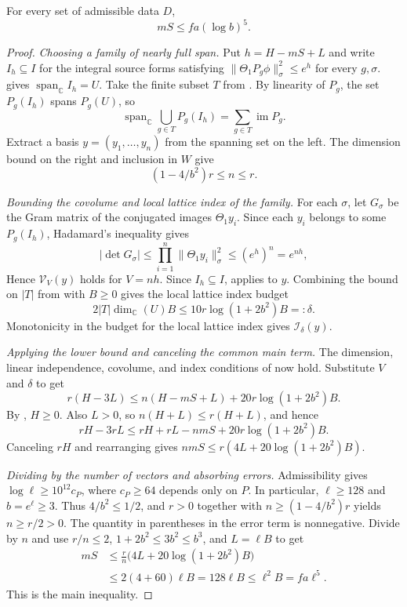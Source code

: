 \begin{theorem}
\label{thm:star}
\emitthmsource
For every set of admissible data $D$,
\begin{equation}
  mS\le fa(\log b)^5.
\tag{$\star$}\label{eq:ch1-star}
\end{equation}
\end{theorem}
\begin{proof}
\emph{Choosing a family of nearly full span.}
Put $h=H-mS+L$ and write $I_h\subseteq I$ for the integral source forms satisfying $\|\Theta_1P_g\phi\|_\sigma^2\le e^h$ for every $g,\sigma$.  gives $\operatorname{span}_{\mathbb C} I_h=U$. Take the finite subset $T$ from . By linearity of $P_g$, the set $P_g(I_h)$ spans $P_g(U)$, so
\[
 \operatorname{span}_{\mathbb C}\bigcup_{g\in T}P_g(I_h)
 =\sum_{g\in T}\operatorname{im}P_g.
\]
Extract a basis $y=(y_1,\ldots,y_n)$ from the spanning set on the left. The dimension bound on the right and inclusion in $W$ give
\[
 (1-4/b^2)r\le n\le r.
\]

\emph{Bounding the covolume and local lattice index of the family.}
For each $\sigma$, let $G_\sigma$ be the Gram matrix of the conjugated images $\Theta_1y_i$. Since each $y_i$ belongs to some $P_g(I_h)$, Hadamard's inequality gives
\[
 |\det G_\sigma|\le\prod_{i=1}^{n}\|\Theta_1y_i\|^2_\sigma
 \le(e^h)^n=e^{nh},
\]
Hence $\mathcal V_V(y)$ holds for $V=nh$. Since $I_h\subseteq I$,  applies to $y$. Combining the bound on $|T|$ from  with $B\ge0$ gives the local lattice index budget
\[
 2|T|\dim_{\mathbb C}(U)B\le 10r\log(1+2b^2)B=:\delta.
\]
Monotonicity in the budget for the local lattice index gives $\mathcal I_\delta(y)$.

\emph{Applying the lower bound and canceling the common main term.}
The dimension, linear independence, covolume, and index conditions of  now hold. Substitute $V$ and $\delta$ to get
\[
 r(H-3L)\le n(H-mS+L)+20r\log(1+2b^2)B.
\]
By , $H\ge0$. Also $L>0$, so $n(H+L)\le r(H+L)$, and hence
\[
 rH-3rL\le rH+rL-nmS+20r\log(1+2b^2)B.
\]
Canceling $rH$ and rearranging gives $nmS\le r(4L+20\log(1+2b^2)B)$.

\emph{Dividing by the number of vectors and absorbing errors.}
Admissibility gives $\log\ell\ge 10^{12}c_P$, where $c_P\ge64$ depends only on $P$. In particular, $\ell\ge128$ and $b=e^\ell\ge3$. Thus $4/b^2\le1/2$, and $r>0$ together with $n\ge(1-4/b^2)r$ yields $n\ge r/2>0$. The quantity in parentheses in the error term is nonnegative. Divide by $n$ and use $r/n\le2$, $1+2b^2\le3b^2\le b^3$, and $L=\ell B$ to get
\[
\begin{aligned}
 mS &\le \frac rn\bigl(4L+20\log(1+2b^2)B\bigr)\\
    &\le 2(4+60)\ell B
     =128\ell B\le \ell^2B=fa\ell^5 .
\end{aligned}
\]
This is the main inequality.
\end{proof}

